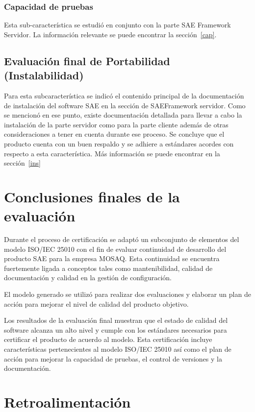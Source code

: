 \subsubsection{Capacidad de pruebas}

Esta sub-característica se estudió en conjunto con la parte SAE Framework 
Servidor. La información relevante se puede encontrar la sección~\ref{cap}.

\subsection{Evaluación final de Portabilidad (Instalabilidad)}

Para esta subcaracterística se indicó el contenido principal de la documentación de instalación
del software SAE en la sección de SAEFramework servidor. Como se mencionó en ese punto, existe
documentación detallada para llevar a cabo la instalación de la parte 
servidor como para la parte cliente además de otras consideraciones a tener en cuenta durante ese proceso.
Se concluye que el producto cuenta con un buen respaldo y se adhiere 
a estándares acordes con respecto a esta característica. Más información se puede encontrar en la sección~\ref{ins}

\section{Conclusiones finales de la evaluación}
Durante el proceso de certificación se adaptó un subconjunto de
elementos del modelo ISO/IEC 25010 con el fin de evaluar continuidad de 
desarrollo del producto SAE para la empresa MOSAQ.
Esta continuidad se encuentra fuertemente ligada a conceptos tales como 
mantenibilidad, calidad de documentación y calidad en la gestión de configuración.

El modelo generado se utilizó para realizar dos evaluaciones y elaborar un plan de acción para mejorar el nivel de calidad del producto objetivo.

Los resultados de la evaluación final muestran que el estado de calidad del 
software alcanza un alto nivel y cumple con los estándares necesarios para 
certificar el producto de acuerdo al modelo. Esta certificación incluye 
características pertenecientes al modelo ISO/IEC 25010 así como el plan de 
acción para mejorar la capacidad de pruebas, el control de versiones y la documentación.

\section{Retroalimentación}


